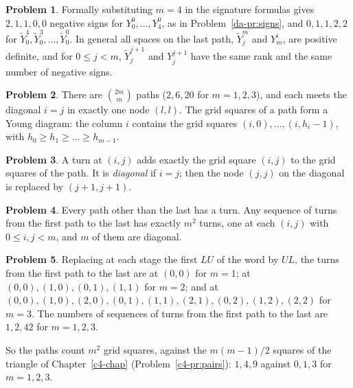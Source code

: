 \documentclass[reqno]{amsart}
\newcounter{chap}
\theoremstyle{definition}
\newtheorem{problem}{Problem}[section]
\theoremstyle{plain}
\newcommand{\Yt}{\widetilde Y}
\begin{document}
\begin{problem}\label{pr:nodes}
Formally substituting \(m = 4\) in the signature formulas gives \(2, 1, 1, 0, 0\) negative signs for \(Y^0_0, \dots, Y^0_4\), as in Problem~\ref{da-pr:signs}, and \(0, 1, 1, 2, 2\) for \(\Yt^4_0, \Yt^3_0, \dots, \Yt^0_0\).  In general all spaces on the last path, \(\Yt^m_j\) and \(Y^i_m\), are positive definite, and for \(0 \le j < m\), \(\Yt^{j+1}_j\) and \(Y^{j+1}_j\) have the same rank and the same number of negative signs.
\end{problem}

\begin{problem}\label{pr:paths}
There are \(\binom{2m}{m}\) paths (\(2, 6, 20\) for \(m = 1, 2, 3\)), and each meets the diagonal \(i = j\) in exactly one node \((l, l)\).  The grid squares of a path form a Young diagram: the column \(i\) contains the grid squares \((i, 0), \dots, (i, h_i - 1)\), with \(h_0 \ge h_1 \ge \dots \ge h_{m-1}\).
\end{problem}

\begin{problem}\label{pr:cells}
A turn at \((i, j)\) adds exactly the grid square \((i, j)\) to the grid squares of the path.  It is \emph{diagonal} if \(i = j\); then the node \((j, j)\) on the diagonal is replaced by \((j+1, j+1)\).
\end{problem}

\begin{problem}\label{pr:all-cells}
Every path other than the last has a turn.  Any sequence of turns from the first path to the last has exactly \(m^2\) turns, one at each \((i, j)\) with \(0 \le i, j < m\), and \(m\) of them are diagonal.
\end{problem}

\begin{problem}\label{pr:turn-order}
Replacing at each stage the first \(LU\) of the word by \(UL\), the turns from the first path to the last are at \((0,0)\) for \(m = 1\); at \((0,0), (1,0), (0,1), (1,1)\) for \(m = 2\); and at \((0,0), (1,0), (2,0), (0,1), (1,1), (2,1), (0,2), (1,2), (2,2)\) for \(m = 3\).  The numbers of sequences of turns from the first path to the last are \(1, 2, 42\) for \(m = 1, 2, 3\).
\end{problem}

So the paths count \(m^2\) grid squares, against the \(m(m-1)/2\) squares of the triangle of Chapter~\ref{c4-chap} (Problem~\ref{c4-pr:pairs}): \(1, 4, 9\) against \(0, 1, 3\) for \(m = 1, 2, 3\).
\end{document}
